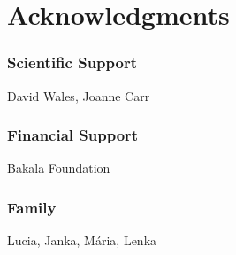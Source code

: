 \chapter*{Acknowledgments}
\subsection*{Scientific Support}
David Wales, Joanne Carr

\subsection*{Financial Support}
Bakala Foundation

\subsection*{Family}
Lucia, Janka, M\'{a}ria, Lenka


